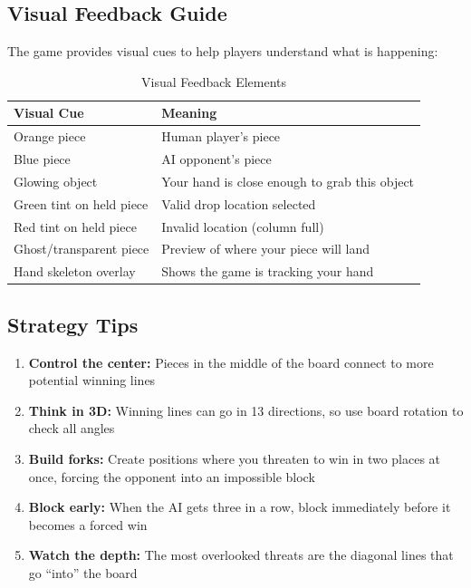 \documentclass[11pt]{article}
\begin{document}

\subsection{Visual Feedback Guide}

The game provides visual cues to help players understand what is happening:

\begin{table}[H]
\centering
\caption{Visual Feedback Elements}
\begin{tabular}{>{\raggedright\arraybackslash}p{4cm}>{\raggedright\arraybackslash}p{8cm}}
\toprule
\textbf{Visual Cue} & \textbf{Meaning} \\
\midrule
Orange piece & Human player's piece \\
Blue piece & AI opponent's piece \\
Glowing object & Your hand is close enough to grab this object \\
Green tint on held piece & Valid drop location selected \\
Red tint on held piece & Invalid location (column full) \\
Ghost/transparent piece & Preview of where your piece will land \\
Hand skeleton overlay & Shows the game is tracking your hand \\
\bottomrule
\end{tabular}
\end{table}


\subsection{Strategy Tips}

\begin{enumerate}
    \item \textbf{Control the center:} Pieces in the middle of the board connect to more potential winning lines
    \item \textbf{Think in 3D:} Winning lines can go in 13 directions, so use board rotation to check all angles
    \item \textbf{Build forks:} Create positions where you threaten to win in two places at once, forcing the opponent into an impossible block
    \item \textbf{Block early:} When the AI gets three in a row, block immediately before it becomes a forced win
    \item \textbf{Watch the depth:} The most overlooked threats are the diagonal lines that go ``into'' the board
\end{enumerate}
\end{document}
